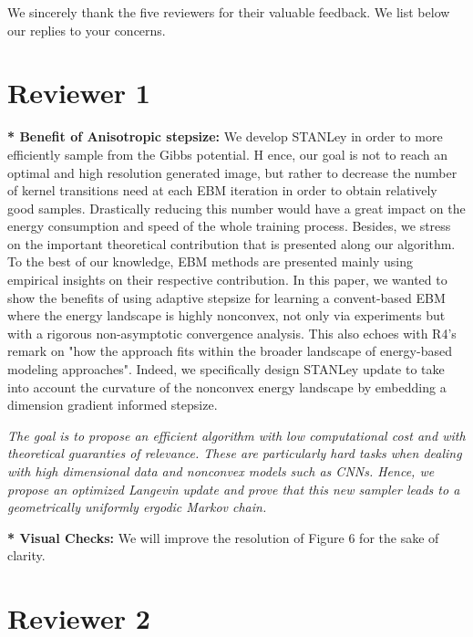 \documentclass[letterpaper]{article} %
\begin{document}
We sincerely thank the five reviewers for their valuable feedback. 
We list below our replies to your concerns.

\vspace{-0.1in}
\section{Reviewer 1}




\noindent \textbf{* Benefit of Anisotropic stepsize:} 
We develop STANLey in order to more efficiently sample from the Gibbs potential. H
ence, our goal is not to reach an optimal and high resolution generated image, but rather to decrease the number of kernel transitions need at each EBM iteration in order to obtain relatively good samples.
Drastically reducing this number would have a great impact on the energy consumption and speed of the whole training process.
Besides, we stress on the important theoretical contribution that is presented along our algorithm. 
To the best of our knowledge, EBM methods are presented mainly using empirical insights on their respective contribution.
In this paper, we wanted to show the benefits of using adaptive stepsize for learning a convent-based EBM where the energy landscape is highly nonconvex, not only via experiments but with a rigorous non-asymptotic convergence analysis.
This also echoes with R4's remark on "how the approach fits within the broader landscape of energy-based modeling approaches".
Indeed, we specifically design STANLey update to take into account the curvature of the nonconvex energy landscape by embedding a dimension gradient informed stepsize.

\textit{The goal is to propose an efficient algorithm with low computational cost and with theoretical guaranties of relevance.
These are particularly hard tasks when dealing with high dimensional data and nonconvex models such as CNNs.
Hence, we propose an optimized Langevin update and prove that this new sampler leads to a geometrically uniformly ergodic Markov chain.}

\noindent \textbf{* Visual Checks:} 
We will improve the resolution of Figure 6 for the sake of clarity.

\vspace{-0.1in}
\section{Reviewer 2}
\end{document}
